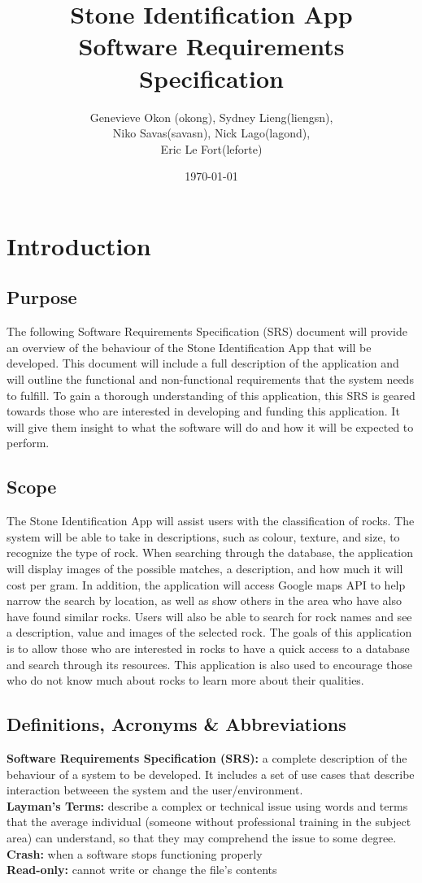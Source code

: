 \documentclass[titlepage]{article}
\title{Stone Identification App \\
	Software Requirements Specification}
\author{Genevieve Okon (okong), Sydney Lieng(liengsn),\\
	Niko Savas(savasn), Nick Lago(lagond),\\
	Eric Le Fort(leforte)}
\date{\today}
\begin{document}
\begin{titlepage}
\maketitle
\end{titlepage}
\tableofcontents
\newpage


\section{Introduction}
\subsection{Purpose}
The following Software Requirements Specification (SRS) document will provide an overview of the behaviour of the Stone Identification App that will be developed. This document will include a full description of the application and will outline the functional and non-functional requirements that the system needs to fulfill. To gain a thorough understanding of this application, this SRS is geared towards those who are interested in developing and funding this application. It will give them insight to what the software will do and how it will be expected to perform.
\subsection{Scope}
The Stone Identification App will assist users with the classification of rocks. The system will be able to take in descriptions, such as colour, texture, and size, to recognize the type of rock. When searching through the database, the application will display images of the possible matches, a description, and how much it will cost per gram. In addition, the application will access Google maps API to help narrow the search by location, as well as show others in the area who have also have found similar rocks. Users will also be able to search for rock names and see a description, value and images of the selected rock. The goals of this application is to allow those who are interested in rocks to have a quick access to a database and search through its resources. This application is also used to encourage those who do not know much about rocks to learn more about their qualities. 
\subsection{Definitions, Acronyms \& Abbreviations}
\textbf{Software Requirements Specification (SRS):} a complete description of the behaviour of a system to be developed. It includes a set of use cases that describe interaction betweeen the system and the user/environment.\\
\textbf{Layman's Terms:} describe a complex or technical issue using words and terms that the average individual (someone without professional training in the subject area) can understand, so that they may comprehend the issue to some degree.\\
\textbf{Crash:} when a software stops functioning properly\\
\textbf{Read-only:} cannot write or change the file's contents
\end{document}
